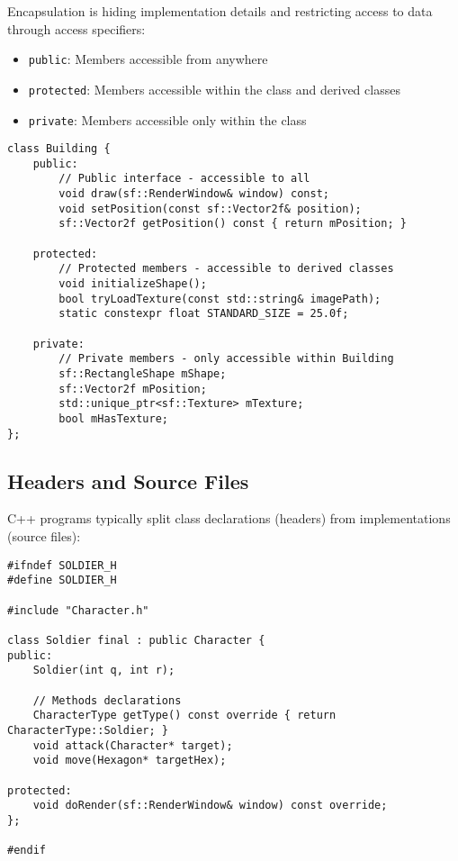 \documentclass{article}
\begin{document}
Encapsulation is hiding implementation details and restricting access to data through access specifiers:

\begin{itemize}
    \item \texttt{public}: Members accessible from anywhere
    \item \texttt{protected}: Members accessible within the class and derived classes
    \item \texttt{private}: Members accessible only within the class
\end{itemize}

\begin{lstlisting}[caption=Encapsulation Example (Building.h)]
class Building {
    public:
        // Public interface - accessible to all
        void draw(sf::RenderWindow& window) const;
        void setPosition(const sf::Vector2f& position);
        sf::Vector2f getPosition() const { return mPosition; }
    
    protected:
        // Protected members - accessible to derived classes
        void initializeShape();
        bool tryLoadTexture(const std::string& imagePath);
        static constexpr float STANDARD_SIZE = 25.0f;
        
    private:
        // Private members - only accessible within Building
        sf::RectangleShape mShape;
        sf::Vector2f mPosition;
        std::unique_ptr<sf::Texture> mTexture;
        bool mHasTexture;
};
\end{lstlisting}

\subsection{Headers and Source Files}

C++ programs typically split class declarations (headers) from implementations (source files):

\begin{lstlisting}[caption=Header File (Soldier.h)]
#ifndef SOLDIER_H
#define SOLDIER_H

#include "Character.h"

class Soldier final : public Character {
public:
    Soldier(int q, int r);
    
    // Methods declarations
    CharacterType getType() const override { return CharacterType::Soldier; }
    void attack(Character* target);
    void move(Hexagon* targetHex);

protected:
    void doRender(sf::RenderWindow& window) const override;
};

#endif
\end{lstlisting}
\end{document}
